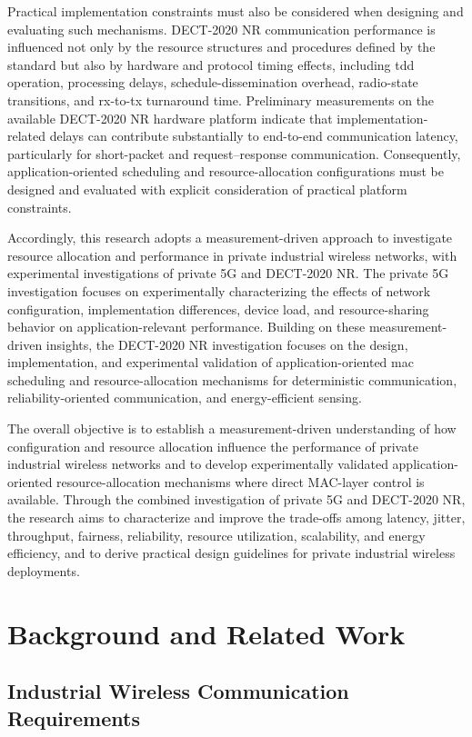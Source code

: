 \documentclass[12pt,a4paper]{article}
\begin{document}
Practical implementation constraints must also be considered when designing
and evaluating such mechanisms. DECT-2020 NR communication performance is
influenced not only by the resource structures and procedures defined by the
standard but also by hardware and protocol timing effects, including
\gls{tdd} operation, processing delays, schedule-dissemination overhead,
radio-state transitions, and \gls{rx}-to-\gls{tx} turnaround time.
Preliminary measurements on the available DECT-2020 NR hardware platform
indicate that implementation-related delays can contribute substantially to
end-to-end communication latency, particularly for short-packet and
request--response communication. Consequently, application-oriented scheduling
and resource-allocation configurations must be designed and evaluated with
explicit consideration of practical platform constraints.

Accordingly, this research adopts a measurement-driven approach to investigate
resource allocation and performance in private industrial wireless networks,
with experimental investigations of private 5G and DECT-2020 NR. The private
5G investigation focuses on experimentally characterizing the effects of
network configuration, implementation differences, device load, and
resource-sharing behavior on application-relevant performance. Building on
these measurement-driven insights, the DECT-2020 NR investigation focuses on
the design, implementation, and experimental validation of
application-oriented \gls{mac} scheduling and resource-allocation mechanisms
for deterministic communication, reliability-oriented communication, and
energy-efficient sensing.

The overall objective is to establish a measurement-driven understanding of
how configuration and resource allocation influence the performance of private
industrial wireless networks and to develop experimentally validated
application-oriented resource-allocation mechanisms where direct MAC-layer
control is available. Through the combined investigation of private 5G and
DECT-2020 NR, the research aims to characterize and improve the trade-offs
among latency, jitter, throughput, fairness, reliability, resource utilization,
scalability, and energy efficiency, and to derive practical design guidelines
for private industrial wireless deployments.

\section{Background and Related Work}
\subsection{Industrial Wireless Communication Requirements}
\end{document}
